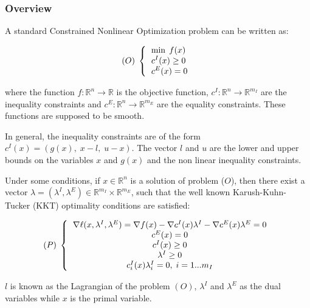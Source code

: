 \subsubsection{Overview}

A standard Constrained Nonlinear Optimization problem can be written as:

\begin{equation*}
  (O)\;
  \left\{
    \begin{tabular}{l}
      $\displaystyle   \min \; f(x)$ \\
      $\displaystyle c^I(x) \geq 0$ \\
      $\displaystyle c^E(x) = 0$
    \end{tabular}
  \right.
\end{equation*}

where the function $f : \mathbb{R}^n \rightarrow  \mathbb{R}$ is the objective function, $c^I : \mathbb{R}^n \rightarrow  \mathbb{R}^{m_I} $ are the inequality constraints and $c^E : \mathbb{R}^n \rightarrow  \mathbb{R}^{m_E} $ are the equality constraints. These functions are supposed to be smooth.

In general, the inequality constraints are of the form $c^I(x) = \left (g(x), \; x-l, \; u-x \right )$. The vector $l$ and $u$ are the lower and upper bounds on the variables $x$ and $g(x)$ and the non linear inequality constraints.

Under some conditions, if $x \in \mathbb{R}^n$ is a solution of problem ($O$), then there exist a vector $\lambda=(\lambda^I,\lambda^E) \in \mathbb{R}^{m_I} \times \mathbb{R}^{m_E}$, such that the well known Karush-Kuhn-Tucker (KKT) optimality conditions are satisfied:

\begin{equation*}
  (P)\;
  \left\{
    \begin{tabular}{c}
      $\nabla \ell(x,\lambda^I, \lambda^E) = \nabla f(x) - \nabla c^I(x) \lambda^I - \nabla c^E(x) \lambda^E= 0$ \\
      $c^E(x) = 0 $ \\
      $c^I(x) \geq 0 $ \\
      $\lambda^I \geq 0 $\\
      $c^I_i(x) \lambda^I_i =0, \; i=1...m_I$ \\
    \end{tabular}
  \right.
\end{equation*}

$l$ is known as the Lagrangian of the problem $(O)$, $\lambda^I$ and $\lambda^E$ as the dual variables while $x$ is the primal variable.

